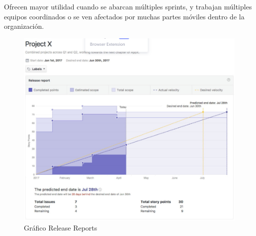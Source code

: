 \documentclass[11pt]{article}
\begin{document}
Ofrecen mayor utilidad cuando se abarcan múltiples sprints, y trabajan múltiples equipos coordinados o se ven afectados por muchas partes móviles dentro de la organización.

\begin{figure}[h!] 
\centering
    \includegraphics[width=1\textwidth]{release-report.PNG}
\caption{Gráfico Release Reports}
\label{fig:control}
\end{figure}




\end{document}
